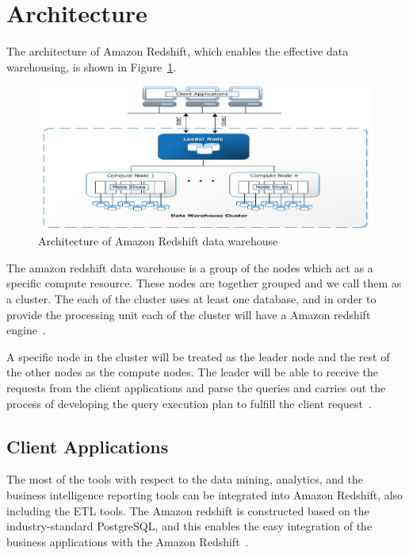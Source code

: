 \section{Architecture}
\label{sa:archi}
	The architecture of Amazon Redshift, which enables the 
	effective data warehousing, is shown in 
	Figure~\ref{sa:archi}.

\begin{figure}[!ht]
\centering\includegraphics[width=\columnwidth]{images/amazon-architecture.png}
\caption{Architecture of Amazon Redshift data 
warehouse~\cite{hid-sp18-412-Amazon_Redshift_architecture}}\label{sa:archi}
\end{figure}

	The amazon redshift data warehouse is a group of the nodes which
	act as a specific compute resource. These nodes are together grouped 
	and we call them as a cluster. The each of the cluster uses at 
	least one database, and in order to provide the processing unit 
	each of the cluster will have a Amazon redshift 
	engine~\cite{hid-sp18-412-Amazon_Redshift_architecture}.

	  A specific node in the cluster will be treated as the leader node and 
	  the rest of the other nodes as the compute nodes. The leader will 
	  be able to receive the requests from the client applications and
	  parse the queries and carries out the process of developing the 
	  query execution plan to fulfill the 
	  client request~\cite{hid-sp18-412-Amazon_Redshift_architecture}.
		
	\subsection{Client Applications}
	The most of the tools with respect to the data mining, analytics, 
	and the business intelligence reporting tools can be integrated into 
	Amazon Redshift, also including the ETL tools. The Amazon redshift is 
	constructed based on the industry-standard PostgreSQL, and this enables 
	the easy integration of the 
	business applications with the 
	Amazon Redshift~\cite{hid-sp18-412-Amazon_Redshift_architecture}.
        
